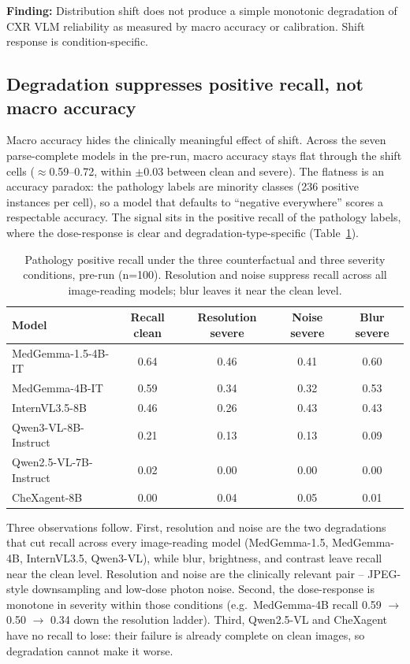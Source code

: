 \textbf{Finding:} Distribution shift does not produce a simple monotonic degradation
of CXR VLM reliability as measured by macro accuracy or calibration. Shift response
is condition-specific.

\subsection{Degradation suppresses positive recall, not macro accuracy}

Macro accuracy hides the clinically meaningful effect of shift. Across the seven
parse-complete models in the pre-run, macro accuracy stays flat through the shift
cells ($\approx$0.59--0.72, within $\pm$0.03 between clean and severe). The
flatness is an accuracy paradox: the pathology labels are minority classes (236
positive instances per cell), so a model that defaults to ``negative everywhere''
scores a respectable accuracy. The signal sits in the positive recall of the
pathology labels, where the dose-response is clear and degradation-type-specific
(Table~\ref{tab:recall}).

\begin{table}[t]
\centering
\small
\begin{tabular}{lcccc}
\hline
Model & Recall clean & Resolution severe & Noise severe & Blur severe \\
\hline
MedGemma-1.5-4B-IT & 0.64 & 0.46 & 0.41 & 0.60 \\
MedGemma-4B-IT & 0.59 & 0.34 & 0.32 & 0.53 \\
InternVL3.5-8B & 0.46 & 0.26 & 0.43 & 0.43 \\
Qwen3-VL-8B-Instruct & 0.21 & 0.13 & 0.13 & 0.09 \\
Qwen2.5-VL-7B-Instruct & 0.02 & 0.00 & 0.00 & 0.00 \\
CheXagent-8B & 0.00 & 0.04 & 0.05 & 0.01 \\
\hline
\end{tabular}
\caption{Pathology positive recall under the three counterfactual and three
severity conditions, pre-run (n=100). Resolution and noise suppress recall across
all image-reading models; blur leaves it near the clean level.}
\label{tab:recall}
\end{table}

Three observations follow. First, resolution and noise are the two degradations
that cut recall across every image-reading model (MedGemma-1.5, MedGemma-4B,
InternVL3.5, Qwen3-VL), while blur, brightness, and contrast leave recall near the
clean level. Resolution and noise are the clinically relevant pair -- JPEG-style
downsampling and low-dose photon noise. Second, the dose-response is monotone in
severity within those conditions (e.g.\ MedGemma-4B recall 0.59 $\rightarrow$ 0.50
$\rightarrow$ 0.34 down the resolution ladder). Third, Qwen2.5-VL and CheXagent have
no recall to lose: their failure is already complete on clean images, so degradation
cannot make it worse.

